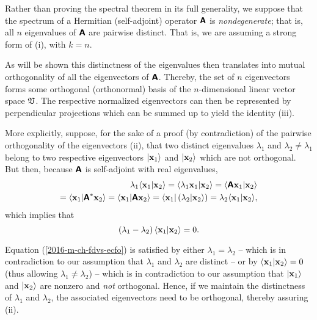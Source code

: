 {\color{OliveGreen}
\bproof
Rather than proving the spectral theorem in its full generality,
we suppose that the spectrum of a Hermitian (self-adjoint) operator $ \textsf{\textbf{A}}$ is {\em nondegenerate};
that is, all $n$ eigenvalues of $\textsf{\textbf{A}}$ are pairwise distinct.
That is, we are assuming a strong form of (i), with $k=n$.

As will be shown this distinctness of the eigenvalues then translates into mutual orthogonality of all the eigenvectors of $ \textsf{\textbf{A}}$.
Thereby, the set of $n$ eigenvectors forms some orthogonal (orthonormal) basis of the $n$-dimensional linear vector space $\frak V$.
The respective normalized eigenvectors can then be represented by perpendicular projections which can be summed up to yield the identity
(iii).

More explicitly, suppose, for the sake of a proof (by contradiction) of the pairwise orthogonality of the eigenvectors (ii),
that two distinct eigenvalues
$\lambda_1$
and
$\lambda_2 \neq \lambda_1$
belong to two respective eigenvectors
$\vert {\bf x}_1\rangle $
and
$\vert {\bf x}_2\rangle $
which are not orthogonal.
But then, because $\textsf{\textbf{A}}$ is self-adjoint with real eigenvalues,
\begin{equation}
\begin{split}
\lambda_1  \langle {\bf x}_1 \vert {\bf x}_2 \rangle =
\langle \lambda_1  {\bf x}_1 \vert {\bf x}_2 \rangle =
  \langle \textsf{\textbf{A}}{\bf x}_1 \vert {\bf x}_2 \rangle \\=
  \langle {\bf x}_1 \vert \textsf{\textbf{A}}^\ast  {\bf x}_2 \rangle =
  \langle {\bf x}_1 \vert \textsf{\textbf{A}}{\bf x}_2 \rangle =
  \langle {\bf x}_1\vert \left( \lambda_2 \vert {\bf x}_2 \rangle \right)=
  \lambda_2 \langle {\bf x}_1 \vert {\bf x}_2 \rangle,
\end{split}
\end{equation}
which implies that
\begin{equation}
\left(\lambda_1 - \lambda_2\right)
\langle {\bf x}_1 \vert {\bf x}_2 \rangle
=
0
.
\label{2016-m-ch-fdvs-ecfo}
\end{equation}

Equation (\ref{2016-m-ch-fdvs-ecfo}) is satisfied by
either $\lambda_1  = \lambda_2$
--
which is in contradiction to our assumption that $\lambda_1$ and $\lambda_2$ are distinct
--
or by  $\langle {\bf x}_1 \vert {\bf x}_2 \rangle =0$  (thus allowing $\lambda_1  \neq \lambda_2$) --
which is in contradiction to our assumption that $\vert {\bf x}_1\rangle$ and $\vert  {\bf x}_2\rangle$
are nonzero and {\em not} orthogonal.
Hence, if we maintain the distinctness of $\lambda_1$ and $\lambda_2$, the associated eigenvectors need to be orthogonal,
thereby assuring (ii).

}

